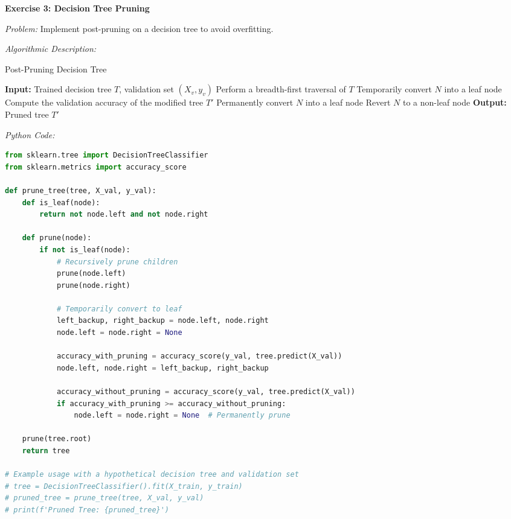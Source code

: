 \documentclass[12pt]{book} %
\begin{document}
\textbf{Exercise 3: Decision Tree Pruning}

\textit{Problem:} Implement post-pruning on a decision tree to avoid overfitting.

\textit{Algorithmic Description:}
\begin{algorithm}
\caption{Post-Pruning Decision Tree}
\begin{algorithmic}[1]
\State \textbf{Input:} Trained decision tree $T$, validation set $(X_v, y_v)$
\State Perform a breadth-first traversal of $T$
    \State Temporarily convert $N$ into a leaf node
    \State Compute the validation accuracy of the modified tree $T'$
        \State Permanently convert $N$ into a leaf node
    \Else
        \State Revert $N$ to a non-leaf node
    \EndIf
\EndFor
\State \textbf{Output:} Pruned tree $T'$
\end{algorithmic}
\end{algorithm}

\FloatBarrier
\textit{Python Code:}
\begin{lstlisting}[language=Python, caption=Decision Tree Pruning]
from sklearn.tree import DecisionTreeClassifier
from sklearn.metrics import accuracy_score

def prune_tree(tree, X_val, y_val):
    def is_leaf(node):
        return not node.left and not node.right

    def prune(node):
        if not is_leaf(node):
            # Recursively prune children
            prune(node.left)
            prune(node.right)

            # Temporarily convert to leaf
            left_backup, right_backup = node.left, node.right
            node.left = node.right = None

            accuracy_with_pruning = accuracy_score(y_val, tree.predict(X_val))
            node.left, node.right = left_backup, right_backup

            accuracy_without_pruning = accuracy_score(y_val, tree.predict(X_val))
            if accuracy_with_pruning >= accuracy_without_pruning:
                node.left = node.right = None  # Permanently prune

    prune(tree.root)
    return tree

# Example usage with a hypothetical decision tree and validation set
# tree = DecisionTreeClassifier().fit(X_train, y_train)
# pruned_tree = prune_tree(tree, X_val, y_val)
# print(f'Pruned Tree: {pruned_tree}')
\end{lstlisting}
\FloatBarrier
\end{document}
